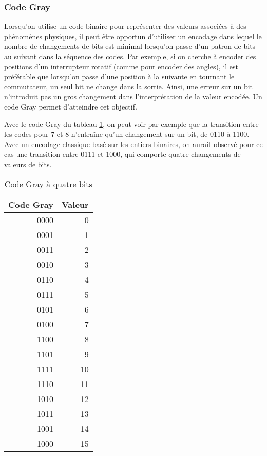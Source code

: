 \documentclass[11pt]{article}
\begin{document}
\subsubsection{Code Gray}
\label{sec:org7cf677c}

Lorsqu'on utilise un code binaire pour représenter des valeurs
associées à des phénomènes physiques, il peut être opportun d'utiliser
un encodage dans lequel le nombre de changements de bits est minimal
lorsqu'on passe d'un patron de bits au suivant dans la séquence des
codes. Par exemple, si on cherche à encoder des positions d'un
interrupteur rotatif (comme pour encoder des angles), il est
préférable que lorsqu'on passe d'une position à la suivante en tournant
le commutateur, un seul bit ne change dans la sortie. Ainsi, une
erreur sur un bit n'introduit pas un gros changement dans
l'interprétation de la valeur encodée. Un code Gray permet d'atteindre
cet objectif.

Avec le code Gray du tableau \ref{tab:orgda71aed}, on peut voir par exemple que la
transition entre les codes pour 7 et 8 n'entraîne qu'un changement sur
un bit, de 0110 à 1100. Avec un encodage classique basé sur les
entiers binaires, on aurait observé pour ce cas une transition entre
0111 et 1000, qui comporte quatre changements de valeurs de bits.

\begin{table}[htbp]
\caption{\label{tab:orgda71aed}Code Gray à quatre bits}
\centering
\begin{tabular}{rr}
Code Gray & Valeur\\[0pt]
\hline
0000 & 0\\[0pt]
0001 & 1\\[0pt]
0011 & 2\\[0pt]
0010 & 3\\[0pt]
0110 & 4\\[0pt]
0111 & 5\\[0pt]
0101 & 6\\[0pt]
0100 & 7\\[0pt]
1100 & 8\\[0pt]
1101 & 9\\[0pt]
1111 & 10\\[0pt]
1110 & 11\\[0pt]
1010 & 12\\[0pt]
1011 & 13\\[0pt]
1001 & 14\\[0pt]
1000 & 15\\[0pt]
\end{tabular}
\end{table}
\end{document}

